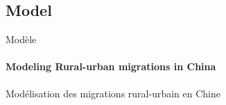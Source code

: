 \subsection{Model}{Modèle}


\paragraph{Modeling Rural-urban migrations in China}{Modélisation des migrations rural-urbain en Chine}






